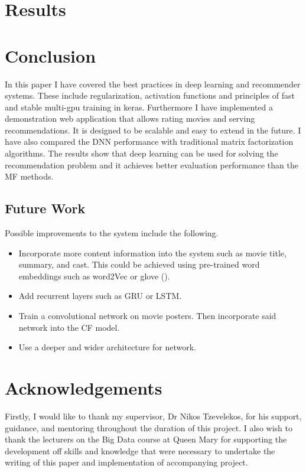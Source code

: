 \documentclass[12pt]{elsarticle}
\begin{document}
\section{Results}


\section{Conclusion}
In this paper I have covered the best practices in deep learning and recommender systems. These include regularization, activation functions and principles of fast and stable multi-gpu training in keras. Furthermore I have implemented a demonstration web application that allows rating movies and serving recommendations. It is designed to be scalable and easy to extend in the future. I have also compared the DNN performance with traditional matrix factorization algorithms. The results show that deep learning can be used for solving the recommendation problem and it achieves better evaluation performance than the MF methods.
\subsection{Future Work}
Possible improvements to the system include the following.
\begin{itemize}
    \item Incorporate more content information into the system such as movie title, summary, and cast. This could be achieved using pre-trained word embeddings such as word2Vec or glove (\citet{glove}).
    \item Add recurrent layers such as GRU or LSTM.
    \item Train a convolutional network on movie posters. Then incorporate said network into the CF model.
    \item Use a deeper and wider architecture for network.
\end{itemize}

\section{Acknowledgements}
Firstly, I would like to thank my supervisor, Dr Nikos Tzevelekos, for his support, guidance, and mentoring throughout the duration of this project. I also wish to thank the lecturers on the Big Data course at Queen Mary for supporting the development off skills and knowledge that were necessary to undertake the writing of this paper and implementation of accompanying project.


\newpage
\appendix

\end{document}
